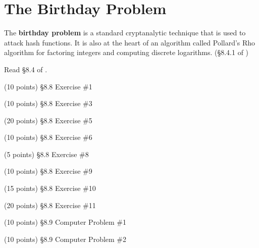 	\section{The Birthday Problem}

	The {\bf birthday problem} is a standard cryptanalytic technique that is used to attack hash functions. It is also at the heart of an algorithm called Pollard's Rho algorithm for factoring integers and computing discrete logarithms. (\S 8.4.1 of \cite{tw})

	Read \S 8.4 of \cite{tw}.

\begin{problem} (10 points)
	\S 8.8 Exercise \#1
\end{problem}

\begin{problem} (10 points)
	\S 8.8 Exercise \#3
\end{problem}

\begin{problem} (20 points)
	\S 8.8 Exercise \#5
\end{problem}

\begin{problem} (10 points)
	\S 8.8 Exercise \#6
\end{problem}

\begin{problem} (5 points)
	\S 8.8 Exercise \#8
\end{problem}

\begin{problem} (10 points)
	\S 8.8 Exercise \#9
\end{problem}

\begin{problem} (15 points)
	\S 8.8 Exercise \#10
\end{problem}

\begin{problem} (20 points)
	\S 8.8 Exercise \#11
\end{problem}

\begin{problem} (10 points)
	\S 8.9 Computer Problem \#1
\end{problem}

\begin{problem} (10 points)
	\S 8.9 Computer Problem \#2
\end{problem}


